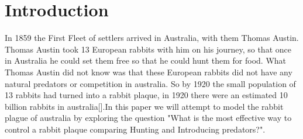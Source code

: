 \documentclass{article}
\begin{document}
\section{Introduction}
In 1859 the First Fleet of settlers arrived in Australia, with them Thomas Austin. Thomas Austin took 13 European rabbits with him on his journey, so that once in Australia he could set them free so that he could hunt them for food. What Thomas Austin did not know was that these European rabbits did not have any natural predators or competition in australia. So by 1920 the small population of 13 rabbits had turned into a rabbit plaque, in 1920 there were an estimated 10 billion rabbits in australia[\cite{RabbitsAus}].In this paper we will attempt to model the rabbit plague of australia by exploring the question "What is the most effective way to control a rabbit plaque comparing Hunting and Introducing predators?".
\end{document}
